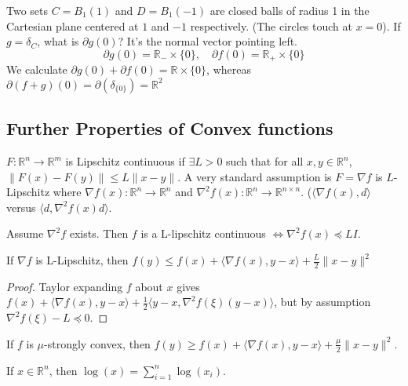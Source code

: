 \documentclass[english, 11pt]{article}
\begin{document}
  \begin{exmp}
  Two sets $C =B_1(1)$ and $D = B_1(-1)$ are closed balls of radius 1 in the Cartesian plane centered at $1$ and $-1$ respectively. (The circles touch at $x=0$).
  If $g = \delta_C$, what is $\partial g(0)$? It's the normal vector pointing left.
  \[
  \partial g(0) = \mathbb{R}_- \times \{0\}, \quad \partial f(0) = \mathbb{R}_+ \times \{0\}
  \]
  We calculate $\partial g(0) + \partial f(0) = \mathbb{R} \times \{0\}$, whereas $\partial (f+g)(0) = \partial (\delta_{\{0\}}) = \mathbb{R} ^2$
  \end{exmp}
  
  \subsection{Further Properties of Convex functions}
  $F:\mathbb{R}^n \to \mathbb{R}^m$ is Lipschitz continuous if $\exists L>0$ such that for all $x,y \in \mathbb{R}^n$, $\|F(x)-F(y)\| \le L \|x-y\|$. A very standard assumption is $F  = \nabla f$ is $L$-Lipschitz where $\nabla f(x) : \mathbb{R}^n \to \mathbb{R}^n $ and $\nabla^2 f(x): \mathbb{R}^n \to \mathbb{R}^{n \times n}$. ($\langle \nabla f(x), d \rangle$ versus $\langle d, \nabla^2 f(x) d \rangle$.
  
\begin{thrm}
Assume $\nabla^2 f$ exists. Then $f$ is a L-lipschitz continuous $\iff \nabla^2 f(x) \preceq LI$.
\end{thrm}

\begin{thrm}
If $\nabla f$ is L-Lipschitz, then $f(y) \le f(x) + \langle \nabla f(x), y-x \rangle + \frac{L}{2} \|x-y\|^2$
\end{thrm}

\begin{proof}
Taylor expanding $f$ about $x$ gives $f(x) +  \langle \nabla f(x), y-x \rangle + \frac{1}{2} \langle y-x , \nabla^2 f(\xi) (y-x) \rangle$, but by assumption $\nabla^2 f(\xi) - L \preceq 0$.
\end{proof}

\begin{thrm}
If $f$ is $\mu$-strongly convex, then $f(y)  \ge f(x) + \langle \nabla f(x), y-x \rangle  + \frac{\mu}{2} \|x-y\|^2$.
\end{thrm}

\begin{rem}
If $x \in \mathbb{R}^n$, then $\log(x) = \sum_{i=1}^n \log(x_i)$.
\end{rem}
\end{document}
